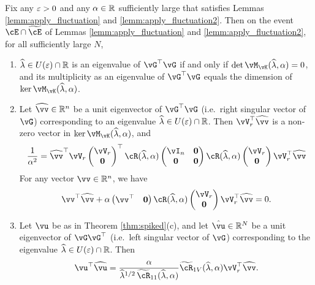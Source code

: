 \begin{prop}\label{prop:master}
Fix any $\varepsilon>0$ and any $\alpha \in \mathbb{R}$ sufficiently large that satisfies
Lemmas \ref{lemm:apply_fluctuation} and \ref{lemm:apply_fluctuation2}.
Then on the event $\cE \cap \widetilde \cE$ of
Lemmas \ref{lemm:apply_fluctuation} and \ref{lemm:apply_fluctuation2},
for all sufficiently large $N$,
\begin{enumerate}[label=(\alph*)]
\item $\widehat \lambda
\in U(\varepsilon) \cap \mathbb{R}$ is an eigenvalue of $\vG^\top \vG$ if and only if
$\det \vM_{\vK}(\widehat\lambda,\alpha)=0$, and its multiplicity as an
eigenvalue of $\vG^\top \vG$ equals the dimension of
$\ker\vM_{\vK}(\widehat\lambda,\alpha)$.
\item Let $\widehat\vv\in\R^n$ be a unit eigenvector of $\vG^\top \vG$ (i.e.\
right singular vector of $\vG$)
corresponding to an eigenvalue $\widehat\lambda \in U(\varepsilon) \cap \mathbb{R}$. Then
$\vV_r^\top\widehat\vv$ is a non-zero vector in $\ker
\vM_{\vK}(\widehat\lambda,\alpha)$, and
\begin{align}\label{eq:norm_vvr_v}
\frac{1}{\alpha^2} = \widehat{\vv}^\top \vV_r
\begin{pmatrix} \vV_r \\ \mathbf{0} \end{pmatrix}^\top
\vcR(\widehat\lambda,\alpha) \begin{pmatrix} \vI_n & \mathbf{0} \\
\mathbf{0} & \mathbf{0} \end{pmatrix} 
\vcR(\widehat\lambda,\alpha) \begin{pmatrix} \vV_r \\ \mathbf{0} \end{pmatrix}
\vV_r^\top \widehat{\vv}
\end{align}
For any vector $\vv\in\R^n$, we have
\begin{equation}\label{eq:vvhat}
\vv^\top \widehat\vv+\alpha\begin{pmatrix} \vv^\top &\mathbf{0}
\end{pmatrix}\vcR(\widehat\lambda,\alpha)\begin{pmatrix} \vV_r \\ \mathbf{0} \end{pmatrix}
\vV_r^\top \widehat\vv=0.
\end{equation}
\item Let $\vu$ be as in Theorem \ref{thm:spiked}(c), and let $\hat{\vu} \in \R^N$ be
a unit eigenvector of $\vG\vG^\top$ (i.e.\ left singular vector of $\vG$)
corresponding to the eigenvalue $\widehat\lambda \in U(\varepsilon) \cap \mathbb{R}$. Then
\begin{equation}\label{eq:uuhat}
	\vu^\top \widehat\vu=\frac{\alpha }{\widehat\lambda^{1/2}\,\widetilde
\cR_{11}(\widehat\lambda,\alpha)}\widetilde\vcR_{1V}(\widehat\lambda,\alpha) \vV_r^\top\widehat\vv.
\end{equation}
\end{enumerate}
\end{prop}
